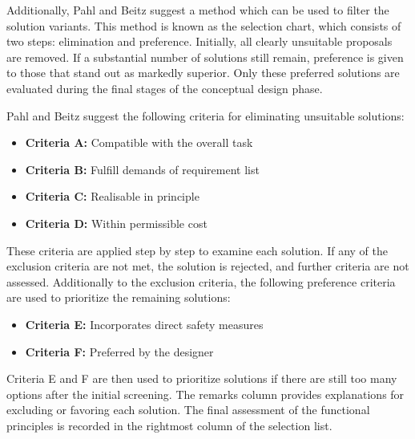 Additionally, Pahl and Beitz \cite{Pahl07s} suggest a method which can be used to filter the solution variants. This method is known as the selection chart, which consists of two steps: elimination and preference. Initially, all clearly unsuitable proposals are removed. If a substantial number of solutions still remain, preference is given to those that stand out as markedly superior. Only these preferred solutions are evaluated during the final stages of the conceptual design phase.

Pahl and Beitz suggest the following criteria for eliminating unsuitable solutions:
\begin{itemize}
    \item \textbf{Criteria A:} Compatible with the overall task
    \item \textbf{Criteria B:} Fulfill demands of requirement list
    \item \textbf{Criteria C:} Realisable in principle
    \item \textbf{Criteria D:} Within permissible cost
\end{itemize}

These criteria are applied step by step to examine each solution. If any of the exclusion criteria are not met, the solution is rejected, and further criteria are not assessed. Additionally to the exclusion criteria, the following preference criteria are used to prioritize the remaining solutions:

\begin{itemize}
    \item \textbf{Criteria E:} Incorporates direct safety measures
    \item \textbf{Criteria F:} Preferred by the designer
\end{itemize}

Criteria E and F are then used to prioritize solutions if there are still too many options after the initial screening. The remarks column provides explanations for excluding or favoring each solution. The final assessment of the functional principles is recorded in the rightmost column of the selection list.


